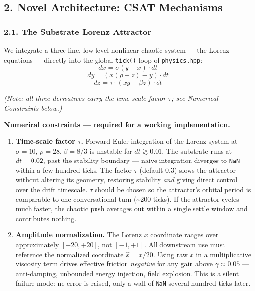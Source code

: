 \documentclass[
  11pt,
  a4paper,
]{article}
\begin{document}
\subsection{2. Novel Architecture: CSAT
Mechanisms}\label{novel-architecture-csat-mechanisms}

\subsubsection{2.1. The Substrate Lorenz
Attractor}\label{the-substrate-lorenz-attractor}

We integrate a three-line, low-level nonlinear chaotic system --- the
Lorenz equations --- directly into the global \texttt{tick()} loop of
\texttt{physics.hpp}: \[ dx = \sigma(y - x) \cdot dt \]
\[ dy = (x(\rho - z) - y) \cdot dt \]
\[ dz = \tau \cdot (xy - \beta z) \cdot dt \]

\emph{(Note: all three derivatives carry the time-scale factor \(\tau\);
see Numerical Constraints below.)}

\textbf{Numerical constraints --- required for a working
implementation.}

\begin{enumerate}
\def\labelenumi{\arabic{enumi}.}
\item
  \textbf{Time-scale factor \(\tau\).} Forward-Euler integration of the
  Lorenz system at \(\sigma = 10\), \(\rho = 28\), \(\beta = 8/3\) is
  unstable for \(dt \gtrsim 0.01\). The substrate runs at \(dt = 0.02\),
  past the stability boundary --- naive integration diverges to
  \texttt{NaN} within a few hundred ticks. The factor \(\tau\) (default
  \(0.3\)) slows the attractor without altering its geometry, restoring
  stability \emph{and} giving direct control over the drift timescale.
  \(\tau\) should be chosen so the attractor's orbital period is
  comparable to one conversational turn (\textasciitilde200 ticks). If
  the attractor cycles much faster, the chaotic push averages out within
  a single settle window and contributes nothing.
\item
  \textbf{Amplitude normalization.} The Lorenz \(x\) coordinate ranges
  over approximately \([-20, +20]\), not \([-1, +1]\). All downstream
  use must reference the normalized coordinate \(\hat{x} = x / 20\).
  Using raw \(x\) in a multiplicative viscosity term drives effective
  friction \emph{negative} for any gain above \(\gamma \approx 0.05\)
  --- anti-damping, unbounded energy injection, field explosion. This is
  a silent failure mode: no error is raised, only a wall of \texttt{NaN}
  several hundred ticks later.
\end{enumerate}
\end{document}
